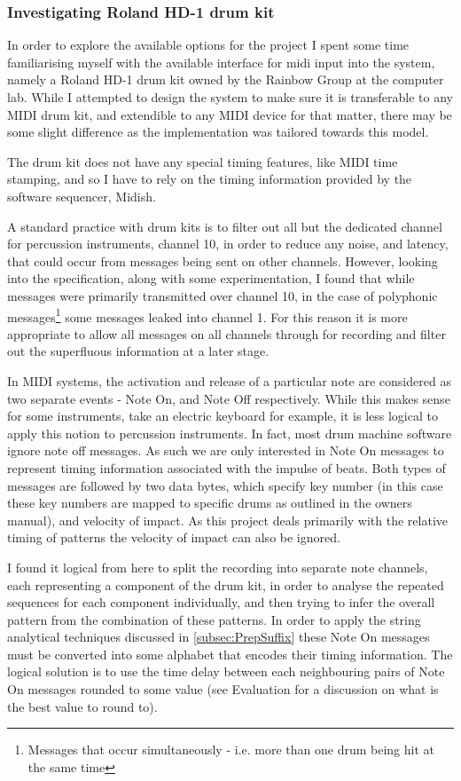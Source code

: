 \documentclass[12pt,twoside,notitlepage]{report}
\begin{document}
		
		
			\subsubsection{Investigating Roland HD-1 drum kit}
			In order to explore the available options for the project I spent some time familiarising myself with the available interface for midi input into the system, namely a Roland HD-1 drum kit owned by the Rainbow Group at the computer lab. While I attempted to design the system to make sure it is transferable to any MIDI drum kit, and extendible to any MIDI device for that matter, there may be some slight difference as the implementation was tailored towards this model.

			The drum kit does not have any special timing features, like MIDI time stamping, and so I have to rely on the timing information provided by the software sequencer, Midish. 
			
			A standard practice with drum kits is to filter out all but the dedicated channel for percussion instruments, channel 10, in order to reduce any noise, and latency, that could occur from messages being sent on other channels. However, looking into the specification, along with some experimentation, I found that while messages were primarily transmitted over channel 10, in the case of polyphonic messages\footnote{Messages that occur simultaneously - i.e. more than one drum being hit at the same time} some messages leaked into channel 1. For this reason it is more appropriate to allow all messages on all channels through for recording and filter out the superfluous information at a later stage.			
			
			In MIDI systems, the activation and release of a particular note are considered as two separate events - Note On, and Note Off respectively. While this makes sense for some instruments, take an electric keyboard for example, it is less logical to apply this notion to percussion instruments. In fact, most drum machine software ignore note off messages. As such we are only interested in Note On messages to represent timing information associated with the impulse of beats. Both types of messages are followed by two data bytes, which specify key number (in this case these key numbers are mapped to specific drums as outlined in the owners manual\cite{Roland}), and velocity of impact. As this project deals primarily with the relative timing of patterns the velocity of impact can also be ignored.
			
			I found it logical from here to split the recording into separate note channels, each representing a component of the drum kit, in order to analyse the repeated sequences for each component individually, and then trying to infer the overall pattern from the combination of these patterns. In order to apply the string analytical techniques discussed in \ref{subsec:PrepSuffix} these Note On messages must be converted into some alphabet that encodes their timing information. The logical solution is to use the time delay between each neighbouring pairs of Note On messages rounded to some value (see Evaluation for a discussion on what is the best value to round to).
			
\end{document}
